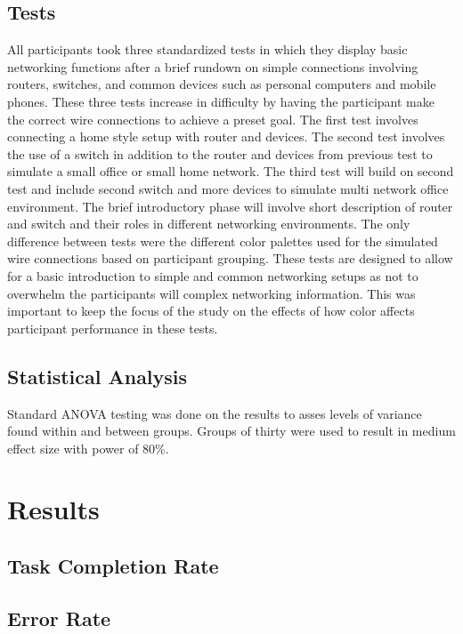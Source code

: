 \documentclass[acmlarge]{acmart}
\begin{document}
\subsection{Tests}
All participants took three standardized tests in which they display basic networking functions after a brief rundown on simple connections involving routers, switches, and common devices such as personal computers and mobile phones. These three tests increase in difficulty by having the participant make the correct wire connections to achieve a preset goal. The first test involves connecting a home style setup with router and devices. The second test involves the use of a switch in addition to the router and devices from previous test to simulate a small office or small home network. The third test will build on second test and include second switch and more devices to simulate multi network office environment. The brief introductory phase will involve short description of router and switch and their roles in different networking environments. The only difference between tests were the different color palettes used for the simulated wire connections based on participant grouping. These tests are designed to allow for a basic introduction to simple and common networking setups as not to overwhelm the participants will complex networking information. This was important to keep the focus of the study on the effects of how color affects participant performance in these tests.

\subsection{Statistical Analysis}
Standard ANOVA testing was done on the results to asses levels of variance found within and between groups. Groups of thirty were used to result in medium effect size with power of 80\%.

\section{Results}

\subsection{Task Completion Rate}

\subsection{Error Rate}
\end{document}
